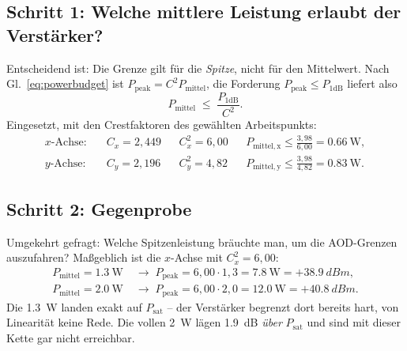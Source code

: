 \documentclass[11pt,a4paper]{article}
\newcommand{\crest}{\ensuremath{C}}
\begin{document}
\subsection{Schritt 1: Welche mittlere Leistung erlaubt der Verstärker?}

Entscheidend ist: Die Grenze gilt für die \emph{Spitze}, nicht für den
Mittelwert. Nach Gl.~\eqref{eq:powerbudget} ist
$P_\mathrm{peak}=\crest^2 P_\mathrm{mittel}$, die Forderung
$P_\mathrm{peak}\le P_{1\mathrm{dB}}$ liefert also
\begin{equation}
  P_\mathrm{mittel} \;\le\; \frac{P_{1\mathrm{dB}}}{\crest^{2}} .
  \label{eq:pavglimit}
\end{equation}
Eingesetzt, mit den Crestfaktoren des gewählten Arbeitspunkts:
\begin{align}
  \text{$x$-Achse:}\quad &\crest_x = 2{,}449
  &&\crest_x^2 = 6{,}00
  &&P_\mathrm{mittel,x} \le \frac{3{,}98}{6{,}00} = \SI{0.66}{\watt},\\
  \text{$y$-Achse:}\quad &\crest_y = 2{,}196
  &&\crest_y^2 = 4{,}82
  &&P_\mathrm{mittel,y} \le \frac{3{,}98}{4{,}82} = \SI{0.83}{\watt}.
\end{align}

\medskip
\noindent{}

\subsection{Schritt 2: Gegenprobe}

Umgekehrt gefragt: Welche Spitzenleistung bräuchte man, um die AOD-Grenzen
auszufahren? Maßgeblich ist die $x$-Achse mit $\crest_x^2=6{,}00$:
\begin{align}
  P_\mathrm{mittel} = \SI{1.3}{\watt} &\;\rightarrow\; P_\mathrm{peak} = 6{,}00\cdot1{,}3 = \SI{7.8}{\watt} = +\SI{38.9}{dBm},\\
  P_\mathrm{mittel} = \SI{2.0}{\watt} &\;\rightarrow\; P_\mathrm{peak} = 6{,}00\cdot2{,}0 = \SI{12.0}{\watt} = +\SI{40.8}{dBm}.
\end{align}
Die \SI{1.3}{\watt} landen exakt auf $P_\mathrm{sat}$ -- der Verstärker
begrenzt dort bereits hart, von Linearität keine Rede. Die vollen
\SI{2}{\watt} lägen \SI{1.9}{\deci\bel} \emph{über} $P_\mathrm{sat}$ und sind
mit dieser Kette gar nicht erreichbar.
\end{document}
